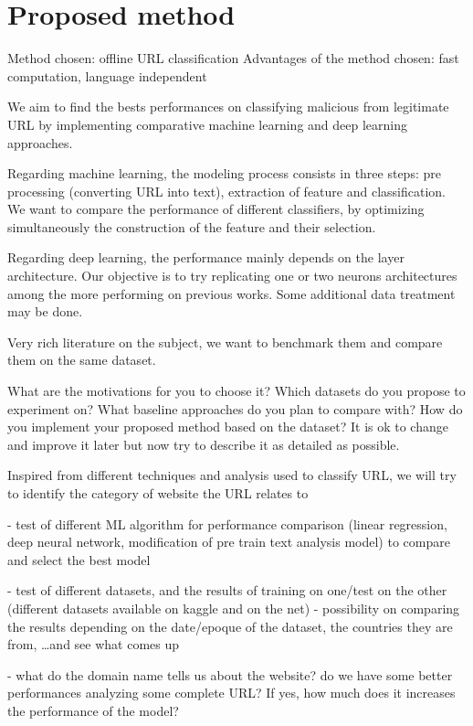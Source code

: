 \documentclass{article}
\begin{document}
    \section{Proposed method}\label{sec:proposed-method}


    Method chosen: offline URL classification
    Advantages of the method chosen: fast computation, language independent

    We aim to find the bests performances on classifying malicious from legitimate URL by implementing comparative machine learning and deep learning approaches.

    Regarding machine learning, the modeling process consists in three steps: pre processing (converting URL into text), extraction of feature and classification.
    We want to compare the performance of different classifiers, by optimizing simultaneously the construction of the feature and their selection.

    Regarding deep learning, the performance mainly depends on the layer architecture.
    Our objective is to try replicating one or two neurons architectures among the more performing on previous works.
    Some additional data treatment may be done.

    Very rich literature on the subject, we want to benchmark them and compare them on the same dataset.

    What are the motivations for you to choose it?
    Which datasets do you propose to
    experiment on?
    What baseline approaches do you plan to compare with?
    How do you implement your proposed method based on the dataset?
    It is ok to change and improve it later but now try to describe it as detailed as possible.

    Inspired from different techniques and analysis used to classify URL, we will try to identify the category of website the URL relates to

    - test of different ML algorithm for performance comparison (linear regression, deep neural network, modification of pre train text analysis model) to compare and select the best model

    - test of different datasets, and the results of training on one/test on the other (different datasets available on kaggle and on the net) - possibility on comparing the results depending on the date/epoque of the dataset, the countries they are from, \ldots and see what comes up

    - what do the domain name tells us about the website?
    do we have some better performances analyzing some complete URL? If yes, how much does it increases the performance of the model?
\end{document}
